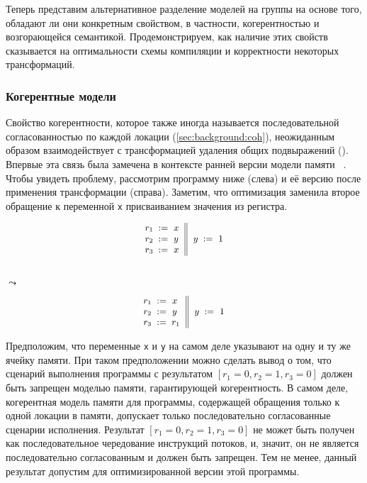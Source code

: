 Теперь представим альтернативное разделение моделей на группы  
на основе того, обладают ли они конкретным свойством, 
в частности, когерентностью и возгорающейся семантикой. 
Продемонстрируем, как наличие этих свойств сказывается 
на оптимальности схемы компиляции и корректности некоторых трансформаций. 

\subsubsection{Когерентные модели}
\label{sec:analysis:coh}

Свойство когерентности, которое также иногда называется 
последовательной согласованностью по каждой локации (\cref{sec:background:coh}), 
неожиданным образом взаимодействует с трансформацией удаления общих подвыражений (\CSE).
Впервые эта связь была замечена в контексте ранней версии модели памяти \Java~\cite{Pugh:JAVA99}.
Чтобы увидеть проблему, рассмотрим программу ниже (слева) 
и её версию после применения трансформации \CSE (справа).
Заметим, что оптимизация заменила второе обращение 
к переменной \texttt{x} присваиванием значения из регистра. 

\begin{minipage}{0.45\linewidth}
\begin{equation*}
\small
\inarrII{
  \readInst{}{r_1}{x}      \\
  \readInst{}{r_2}{y}      \\
  \readInst{}{r_3}{x}      \\
}{
  \writeInst{}{y}{1}       \\
}
\label{ex:coh-rr}
\end{equation*}
\end{minipage}\hfill%
\begin{minipage}{0.05\linewidth}
\Large~\\ $\leadsto$
\end{minipage}\hfill%
\begin{minipage}{0.45\linewidth}
\begin{equation*}
\small
\inarrII{
  \readInst{}{r_1}{x}      \\
  \readInst{}{r_2}{y}      \\
  \assignInst{r_3}{r_1}    \\
}{
  \writeInst{}{y}{1}       \\
}
\label{ex:coh-rr}
\end{equation*}
\end{minipage}

Предположим, что переменные \texttt{x} и \texttt{y} 
на самом деле указывают на одну и ту же ячейку памяти.  
При таком предположении можно сделать вывод о том, что 
сценарий выполнения программы с результатом ${[r_1=0, r_2=1, r_3=0]}$
должен быть запрещен моделью памяти, гарантирующей когерентность. 
В самом деле, когерентная модель памяти для программы, 
содержащей обращения только к одной локации в памяти, 
допускает только последовательно согласованные сценарии исполнения.
Результат ${[r_1=0, r_2=1, r_3=0]}$ не может быть получен
как последовательное чередование инструкций потоков, 
и, значит, он не является последовательно согласованным и должен быть запрещен.
Тем не менее, данный результат допустим для 
оптимизированной версии этой программы. 

